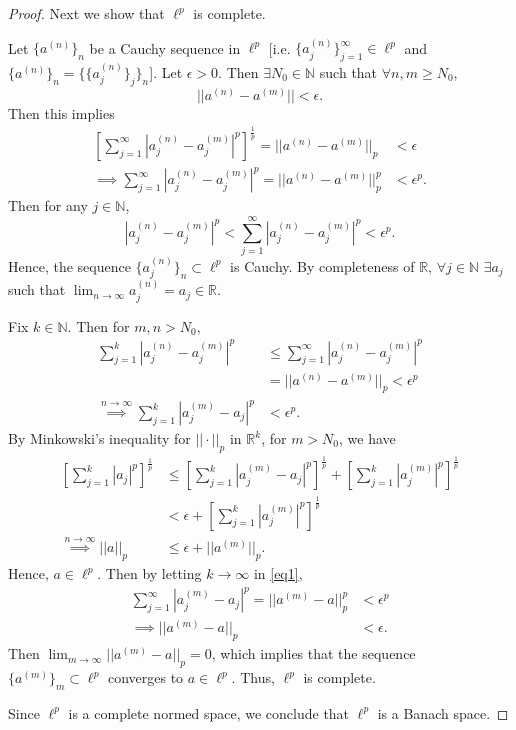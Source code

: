 \documentclass{article}
\begin{document}
\begin{proof}
	Next we show that $\ell^p$ is complete. 
	
	Let $\{a^{(n)}\}_n$ be a Cauchy sequence in $\ell^p$ [i.e. $\{a_j^{(n)}\}_{j=1}^{\infty}\in\ell^p$ and $\{a^{(n)}\}_n=\{\{a_j^{(n)}\}_{j}\}_{n}$]. Let $\epsilon>0$. Then $\exists N_0\in\mathbb{N}$ such that $\forall n,m\geq N_0$,
	\begin{equation}
		||a^{(n)}-a^{(m)}||<\epsilon.
	\end{equation}
	Then this implies
	\begin{align}
		\left[\sum_{j=1}^{\infty}|a_j ^{(n)} - a_j ^{(m)}|^p\right]^\frac{1}{p} = ||a^{(n)}-a^{(m)}||_p &< \epsilon \\
		\implies \sum_{j=1}^{\infty} |a_j ^{(n)} - a_j ^{(m)}|^p = ||a^{(n)}-a^{(m)}||_p ^{p} &< \epsilon^p.
	\end{align}
	Then for any $j\in\mathbb{N}$, 
	\begin{equation}
		|a_j ^{(n)} - a_j ^{(m)}|^p < \sum_{j=1}^{\infty} |a_j ^{(n)} - a_j ^{(m)}|^p < \epsilon^p.
	\end{equation}
	Hence, the sequence $\{a_j^{(n)}\}_n \subset \ell^p$ is Cauchy. By completeness of $\mathbb{R}$, $\forall j\in\mathbb{N}$ $\exists a_j$ such that $\lim_{n \to \infty} a_j ^{(n)} = a_j \in \mathbb{R}$. 
	
	Fix $k\in\mathbb{N}$. Then for $m,n > N_0$, 
	\begin{align}
		\sum_{j=1}^k |a_j ^{(n)}-a_j^{(m)}|^p &\leq \sum_{j=1}^{\infty} |a_j ^{(n)}-a_j^{(m)}|^p \\
		&= ||a^{(n)}-a^{(m)}||_p < \epsilon^p\\
		\overset{n \to \infty}\implies 	\sum_{j=1}^k |a_j ^{(m)}-a_j|^p &< \epsilon^p. \label{eq1} 
	\end{align}
	By Minkowski's inequality for $||\cdot||_p$ in $\mathbb{R}^k$, for $m>N_0$, we have
	\begin{align}
		\left[\sum_{j=1}^k |a_j|^p\right]^\frac{1}{p} &\leq \left[\sum_{j=1}^k |a_j^{(m)}-a_j|^p\right]^\frac{1}{p} + \left[\sum_{j=1}^k |a_j^{(m)}|^p\right]^\frac{1}{p} \\
		&< \epsilon + \left[\sum_{j=1}^k |a_j^{(m)}|^p\right]^\frac{1}{p} \\
		\overset{n \to \infty}\implies ||a||_p &\leq \epsilon + ||a^{(m)}||_p.
	\end{align}
	Hence, $a \in \ell^p$. Then by letting $k \to \infty$ in \eqref{eq1}, 
	\begin{align}
		\sum_{j=1}^{\infty} |a_j ^{(m)}-a_j|^p = ||a^{(m)}-a||_p ^{p} &< \epsilon ^p \\
		\implies ||a^{(m)}-a||_p &< \epsilon.  
	\end{align}
	Then $\lim_{m \to \infty} ||a^{(m)}-a||_p = 0$, which implies that the sequence $\{a^{(m)}\}_m \subset \ell^p$  converges to $a\in\ell^p$. Thus, $\ell^p$ is complete.
	
	Since $\ell^p$ is a complete normed space, we conclude that $\ell^p$ is a Banach space. 
\end{proof}
\end{document}
